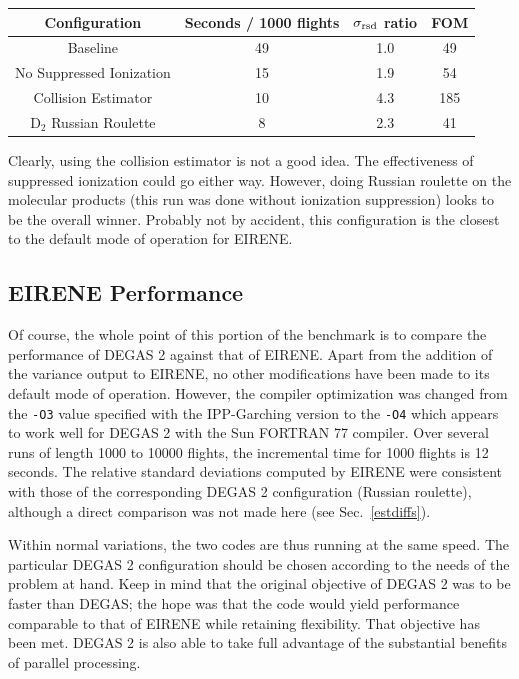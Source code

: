 \documentclass[12pt]{report}
\begin{document}
\begin{tabular}{|c|c|c|c|}
\hline
Configuration & Seconds / 1000 flights & $\sigma_{\rm rsd}$ ratio & FOM \\ \hline 
Baseline      &             49         &     1.0               &  49 \\ \hline
No Suppressed Ionization &  15         &     1.9               &  54 \\ \hline
Collision Estimator      &  10         &     4.3               & 185 \\ \hline
D$_{2}$ Russian Roulette &   8         &     2.3               &  41 \\ \hline
\end{tabular}

Clearly, using the collision estimator is not a good idea. The effectiveness
of suppressed ionization could go either way. However, doing Russian
roulette on the molecular products (this run was done without ionization
suppression) looks to be the overall winner. Probably not by accident, this
configuration is the closest to the default mode of operation for EIRENE.

\subsection{EIRENE Performance}

Of course, the whole point of this portion of the benchmark is to compare
the performance of DEGAS 2 against that of EIRENE. Apart from the addition
of the variance output to EIRENE, no other modifications have been made to
its default mode of operation. However, the compiler optimization was
changed from the \verb+-O3+ value specified with the IPP-Garching version
to the \verb+-O4+ which appears to work well for DEGAS 2 with the Sun
FORTRAN 77 compiler. Over several runs of length 1000 to 10000 flights,
the incremental time for 1000 flights is 12 seconds. 
The relative standard deviations computed by EIRENE were consistent with
those of the corresponding DEGAS 2 configuration (Russian roulette), 
although a direct comparison was not made here (see
Sec.~\ref{estdiffs}). 

Within normal variations, the two codes are thus running at the same
speed. The particular DEGAS 2 configuration should be chosen according to
the needs of the problem at hand. Keep in mind that the original objective of
DEGAS 2 was to be faster than DEGAS; the hope was that the code would
yield performance comparable to that of EIRENE while retaining
flexibility. That objective has been met. DEGAS 2 is also able
to take full advantage of the substantial 
benefits of parallel processing.
\end{document}
